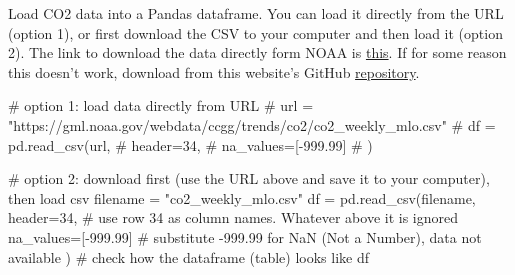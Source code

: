 \documentclass[
  letterpaper,
  DIV=11,
  numbers=noendperiod,
  oneside]{scrreprt}
\newenvironment{Shaded}{\begin{snugshade}}{\end{snugshade}}
\newcommand{\CommentTok}[1]{\textcolor[rgb]{0.37,0.37,0.37}{#1}}
\newcommand{\DecValTok}[1]{\textcolor[rgb]{0.68,0.00,0.00}{#1}}
\newcommand{\FloatTok}[1]{\textcolor[rgb]{0.68,0.00,0.00}{#1}}
\newcommand{\NormalTok}[1]{\textcolor[rgb]{0.00,0.23,0.31}{#1}}
\newcommand{\OperatorTok}[1]{\textcolor[rgb]{0.37,0.37,0.37}{#1}}
\newcommand{\StringTok}[1]{\textcolor[rgb]{0.13,0.47,0.30}{#1}}
\begin{document}
Load CO2 data into a Pandas dataframe. You can load it directly from the
URL (option 1), or first download the CSV to your computer and then load
it (option 2). The link to download the data directly form NOAA is
\href{https://gml.noaa.gov/webdata/ccgg/trends/co2/co2_weekly_mlo.csv}{this}.
If for some reason this doesn't work, download from this website's
GitHub
\href{https://raw.githubusercontent.com/yairmau/time-series/main/basics/co2_weekly_mlo.csv}{repository}.

\begin{Shaded}
\begin{Highlighting}[]
\CommentTok{\# option 1: load data directly from URL}
\CommentTok{\# url = "https://gml.noaa.gov/webdata/ccgg/trends/co2/co2\_weekly\_mlo.csv"}
\CommentTok{\# df = pd.read\_csv(url,}
\CommentTok{\#                  header=34,}
\CommentTok{\#                  na\_values=[{-}999.99]}
\CommentTok{\#                  )}

\CommentTok{\# option 2: download first (use the URL above and save it to your computer), then load csv}
\NormalTok{filename }\OperatorTok{=} \StringTok{"co2\_weekly\_mlo.csv"}
\NormalTok{df }\OperatorTok{=}\NormalTok{ pd.read\_csv(filename,}
\NormalTok{                 header}\OperatorTok{=}\DecValTok{34}\NormalTok{,  }\CommentTok{\# use row 34 as column names. Whatever above it is ignored}
\NormalTok{                 na\_values}\OperatorTok{=}\NormalTok{[}\OperatorTok{{-}}\FloatTok{999.99}\NormalTok{]  }\CommentTok{\# substitute {-}999.99 for NaN (Not a Number), data not available}
\NormalTok{                 )}
\CommentTok{\# check how the dataframe (table) looks like}
\NormalTok{df}
\end{Highlighting}
\end{Shaded}
\end{document}
